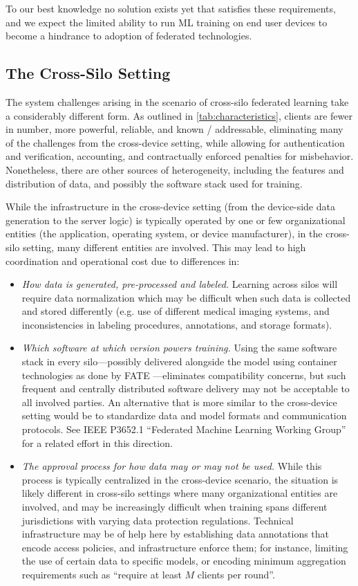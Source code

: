 \documentclass[11pt]{article}
\begin{document}
To our best knowledge no solution exists yet that satisfies these requirements, and we expect the limited ability to run ML training on end user devices to become a hindrance to adoption of federated technologies.

\subsection{The Cross-Silo Setting}
\label{subsec:systems-cross-silo-setting}
The system challenges arising in the scenario of cross-silo federated learning take a considerably different form. As outlined in \cref{tab:characteristics}, clients are fewer in number, more powerful, reliable, and known / addressable, eliminating many of the challenges from the cross-device setting, while allowing for authentication and verification, accounting, and contractually enforced penalties for misbehavior. Nonetheless, there are other sources of heterogeneity, including the features and distribution of data, and possibly the software stack used for training.

While the infrastructure in the cross-device setting (from the device-side data generation to the server logic) is typically operated by one or few organizational entities (the application, operating system, or device manufacturer), in the cross-silo setting, many different entities are involved. This may lead to high coordination and operational cost due to differences in:
\begin{itemize}
    \item \emph{How data is generated, pre-processed and labeled.}  Learning across silos will require data normalization which may be difficult when such data is collected and stored differently (e.g. use of different medical imaging systems, and inconsistencies in labeling procedures, annotations, and storage formats).
    \item \emph{Which software at which version powers training.} Using the same software stack in every silo---possibly delivered alongside the model using container technologies as done by FATE \cite{FATE}---eliminates compatibility concerns, but such frequent and centrally distributed software delivery may not be acceptable to all involved parties. An alternative that is more similar to the cross-device setting would be to standardize data and model formats and communication protocols. See IEEE P3652.1 ``Federated Machine Learning Working Group'' for a related effort in this direction.
    \item \emph{The approval process for how data may or may not be used.} While this process is typically centralized in the cross-device scenario, the situation is likely different in cross-silo settings where many organizational entities are involved, and may be increasingly difficult when training spans different jurisdictions with varying data protection regulations. Technical infrastructure may be of help here by establishing data annotations that encode access policies, and infrastructure enforce them; for instance, limiting the use of certain data to specific models, or encoding minimum aggregation requirements such as ``require at least $M$ clients per round''.
\end{itemize}
\end{document}
